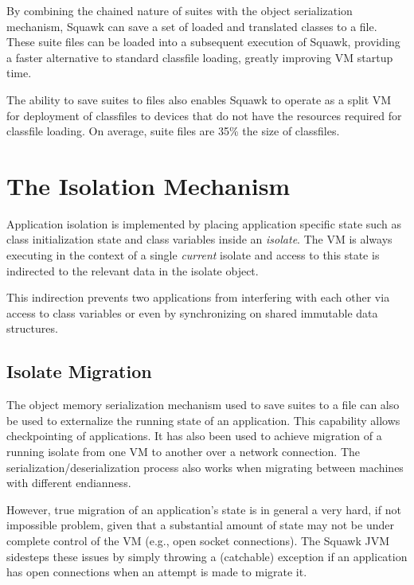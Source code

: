 \documentclass{sig-alt-sun}
\begin{document}
By combining the chained nature of suites with the object serialization
mechanism, Squawk can save a set of loaded and translated
classes to a file. These suite files can be loaded into a subsequent
execution of Squawk, providing a faster alternative to
standard classfile loading, greatly improving VM startup time.

The ability to save suites to files also enables Squawk to
operate as a split VM for deployment of classfiles to devices that
do not have the resources required for classfile loading. 
On average, suite files are 35\% the size of classfiles.


\section{The Isolation Mechanism}

Application isolation is implemented by placing application specific
state such as class initialization state and class variables inside
an {\em isolate}. The VM is always
executing in the context of a single {\em current} isolate and
access to this state is indirected to the relevant data in the
isolate object.

This indirection prevents two applications from interfering
with each other via access to class variables or even by synchronizing
on shared immutable data structures.

\subsection*{Isolate Migration}

The object memory serialization mechanism used to save suites to a file
can also be used to externalize the running state of an application.
This capability allows checkpointing of applications. It has also been
used to achieve migration of a running isolate from one VM to another
over a network connection. The serialization/deserialization process
also works when migrating between machines with different endianness.

However, true migration of an application's state is in general a very
hard, if not impossible problem, given that a substantial amount of
state may not be under complete control of the VM (e.g., open socket
connections). The Squawk JVM sidesteps these issues by simply throwing
a (catchable) exception if an application has open connections when
an attempt is made to migrate it.
\end{document}
